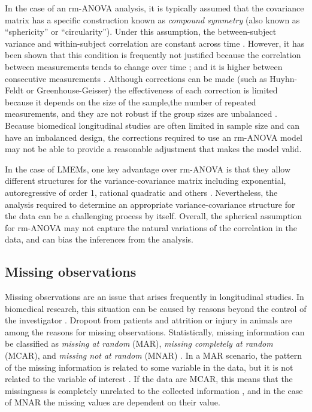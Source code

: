 \documentclass[Royal,times,sagev]{sagej}
\begin{document}
In the case of an rm-ANOVA analysis, it is typically assumed that the
covariance matrix has a specific construction known as \emph{compound
symmetry} (also known as ``sphericity'' or ``circularity''). Under this
assumption, the between-subject variance and within-subject correlation
are constant across time \citep{weiss2005, geisser1958, huynh1976}.
However, it has been shown that this condition is frequently not
justified because the correlation between measurements tends to change
over time \citep{maxwell2017}; and it is higher between consecutive
measurements \citep{gueorguieva2004, ugrinowitsch2004}. Although
corrections can be made (such as Huyhn-Feldt or
Greenhouse-Geisser)\citep{huynh1976, greenhouse1959} the effectiveness
of each correction is limited because it depends on the size of the
sample,the number of repeated measurements\citep{haverkamp2017}, and
they are not robust if the group sizes are unbalanced
\citep{keselman2001}. Because biomedical longitudinal studies are often
limited in sample size and can have an imbalanced design, the
corrections required to use an rm-ANOVA model may not be able to provide
a reasonable adjustment that makes the model valid.

In the case of LMEMs, one key advantage over rm-ANOVA is that they allow
different structures for the variance-covariance matrix including
exponential, autoregressive of order 1, rational quadratic and others
\citep{pinheiro2006}. Nevertheless, the analysis required to determine
an appropriate variance-covariance structure for the data can be a
challenging process by itself. Overall, the spherical assumption for
rm-ANOVA may not capture the natural variations of the correlation in
the data, and can bias the inferences from the analysis.

\hypertarget{missing-observations}{%
\subsection{Missing observations}\label{missing-observations}}

Missing observations are an issue that arises frequently in longitudinal
studies. In biomedical research, this situation can be caused by reasons
beyond the control of the investigator \citep{molenberghs2004}. Dropout
from patients and attrition or injury in animals are among the reasons
for missing observations. Statistically, missing information can be
classified as \emph{missing at random} (MAR), \emph{missing completely
at random} (MCAR), and \emph{missing not at random} (MNAR)
\citep{weiss2005}. In a MAR scenario, the pattern of the missing
information is related to some variable in the data, but it is not
related to the variable of interest \citep{scheffer2002}. If the data
are MCAR, this means that the missingness is completely unrelated to the
collected information \citep{potthoff2006}, and in the case of MNAR the
missing values are dependent on their value.
\end{document}
